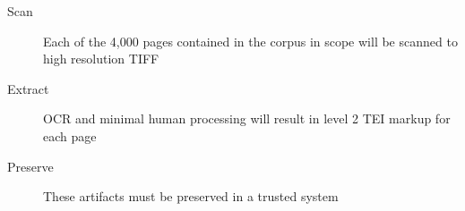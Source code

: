 \begin{description}
  \item[Scan]{Each of the 4,000 pages contained in the corpus in scope will be scanned to high resolution TIFF}
  \item[Extract]{OCR and minimal human processing will result in level 2 TEI\cite{tei_sig_on_libraries_best_2011} markup for each page}
  \item[Preserve]{These artifacts must be preserved in a trusted system}
\end{description}